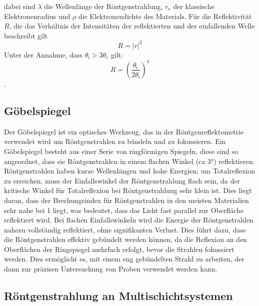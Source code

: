 dabei sind $\lambda$ die Wellenlänge der Röntgenstrahlung, \(r_\text{e}\) der klassische Elektronenradius und $\rho$ die Elektronendichte des Materials.
Für die Reflektivität \(R\), die das Verhältnis der Intensitäten der reflektierten und der einfallenden Welle beschreibt gilt
\begin{equation}
    R=|r|^2
\end{equation}
Unter der Annahme, dass $\theta_\text{i} > 3\theta_\text{c}$ gilt:
\begin{equation}
    R=\left(\frac{\theta_\text{c}}{2\theta_\text{i}}\right)^4
    \label{eq:fresnelreflektivität}
\end{equation} 
\cite{Röntgenstrahlung}.

\subsection{Göbelspiegel}
Der Göbelspiegel ist ein optisches Werkzeug, das in der  Röntgenreflektometrie verwendet wird um Röntgenstrahlen 
zu bündeln und zu fokussieren. Ein Göbelspiegel besteht aus einer Serie von ringförmigen Spiegeln, diese sind so angeordnet,
dass sie Röntgenstrahlen in einem flachen Winkel (ca 3°) reflektieren. Röntgenstrahlen haben kurze Wellenlängen und hohe Energien;
um Totalreflexion zu erreichen, muss der Einfallswinkel der Röntgenstrahlung flach sein, da der kritische Winkel für Totalreflexion
bei Röntgenstrahlung sehr klein ist. Dies liegt daran, dass der Brechungsindex für Röntgenstrahlen in den meisten Materialien sehr
nahe bei 1 liegt, was bedeutet, dass das Licht fast parallel zur Oberfläche reflektiert wird. Bei flachen Einfallswinkeln wird die Energie
der Röntgenstrahlen nahezu vollständig reflektiert, ohne signifikanten Verlust. Dies führt dazu, dass die Röntgenstrahlen effektiv gebündelt 
werden können, da die Reflexion an den Oberflächen der Ringspiegel mehrfach erfolgt, bevor die Strahlen fokussiert werden. Dies ermöglicht es,
mit einem eng gebündelten Strahl zu arbeiten, der dann zur präzisen Untersuchung von Proben verwendet werden kann.

\subsection{Röntgenstrahlung an Multischichtsystemen}


